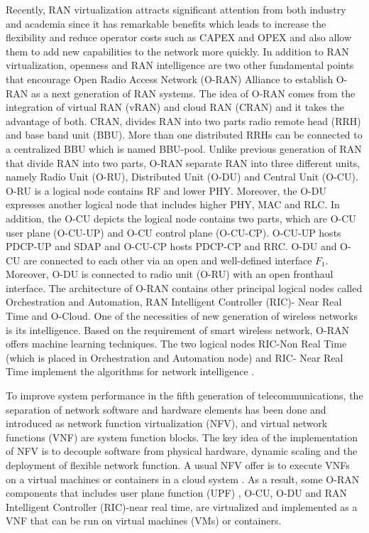 \documentclass[conference]{IEEEtran}
\begin{document}
Recently, RAN virtualization attracts significant attention from  both industry and academia since it 
has remarkable benefits which leads to increase the flexibility and 
reduce operator costs
such as CAPEX and OPEX and also allow them to add new capabilities to the network more quickly.
In addition to RAN virtualization, openness and RAN intelligence are two other fundamental points that encourage Open Radio Access Network (O-RAN)
Alliance to establish O-RAN as a next generation of RAN systems. 
The idea of O-RAN comes from the integration of virtual RAN (vRAN) and cloud RAN (CRAN) and it takes the advantage of both.
CRAN, divides RAN into two parts radio remote head (RRH) and base band unit (BBU). 
More than one distributed RRHs can be connected to a centralized BBU which is named BBU-pool\cite{han2019research}.
Unlike previous generation of RAN that divide RAN into two parts, O-RAN separate RAN into three different units, namely Radio Unit (O-RU), Distributed Unit (O-DU) and
Central Unit (O-CU).
O-RU is a logical node contains RF and lower PHY. Moreover, the O-DU expresses another logical node that includes higher PHY, MAC and RLC. In addition, the O-CU depicts the logical node contains two parts, which are O-CU user plane (O-CU-UP) and O-CU control plane (O-CU-CP). O-CU-UP hosts PDCP-UP and SDAP and
O-CU-CP hosts PDCP-CP and RRC.
O-DU and O-CU are connected to each other via an open and well-defined interface $F_1$.
Moreover, O-DU is connected to radio unit (O-RU) with an open fronthaul interface.
The architecture of O-RAN contains other principal logical nodes called Orchestration and Automation,
RAN Intelligent Controller (RIC)- Near Real Time and O-Cloud. 
One of the necessities of new generation of wireless networks is its intelligence.
Based on the requirement of smart wireless network, O-RAN offers machine learning techniques.
The two logical nodes RIC-Non Real Time (which is placed in Orchestration and Automation node) and RIC- Near Real Time implement the algorithms for network intelligence 
\cite{gavrilovska2020cloud,niknam2020intelligent,kazemifard2021minimum,both2021system,ORANArch,ORANML,lin2021toward}.

To improve system performance in the fifth generation of telecommunications, the separation of network software and hardware elements has been done and introduced as network function virtualization (NFV), and virtual network functions (VNF) are system function blocks. The key idea of the implementation of NFV is 
to decouple software from physical hardware, dynamic scaling and the deployment of flexible network function. A usual NFV offer is to execute VNFs on a virtual machines or containers in a cloud system \cite{mijumbi2015network, luo2020online}.
As a result, some O-RAN components that includes user plane function (UPF) , O-CU, O-DU and RAN Intelligent Controller (RIC)-near real time, are virtualized and implemented as a VNF that can be run on virtual machines (VMs) or containers.
\end{document}
